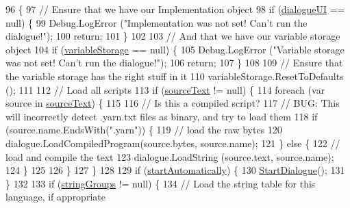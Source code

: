 \begin{DoxyCode}
96         \{
97             \textcolor{comment}{// Ensure that we have our Implementation object}
98             \textcolor{keywordflow}{if} (\hyperlink{a00073_ac87fdc65b0be57868f80c0fcd62ffd6d}{dialogueUI} == null) \{
99                 Debug.LogError (\textcolor{stringliteral}{"Implementation was not set! Can't run the dialogue!"});
100                 \textcolor{keywordflow}{return};
101             \}
102 
103             \textcolor{comment}{// And that we have our variable storage object}
104             \textcolor{keywordflow}{if} (\hyperlink{a00073_a6cca3d33f8b0ce3e750caed9fd8fc734}{variableStorage} == null) \{
105                 Debug.LogError (\textcolor{stringliteral}{"Variable storage was not set! Can't run the dialogue!"});
106                 \textcolor{keywordflow}{return};
107             \}
108 
109             \textcolor{comment}{// Ensure that the variable storage has the right stuff in it}
110             variableStorage.ResetToDefaults ();
111 
112             \textcolor{comment}{// Load all scripts}
113             \textcolor{keywordflow}{if} (\hyperlink{a00073_a71eae33d06990a3aec5d444fae017492}{sourceText} != null) \{
114                 \textcolor{keywordflow}{foreach} (var source \textcolor{keywordflow}{in} \hyperlink{a00073_a71eae33d06990a3aec5d444fae017492}{sourceText}) \{
115 
116                     \textcolor{comment}{// Is this a compiled script?}
117                     \textcolor{comment}{// BUG: This will incorrectly detect .yarn.txt files as binary, and try to load them}
118                     \textcolor{keywordflow}{if} (source.name.EndsWith(\textcolor{stringliteral}{".yarn"})) \{
119                         \textcolor{comment}{// load the raw bytes}
120                         dialogue.LoadCompiledProgram(source.bytes, source.name);
121                     \} \textcolor{keywordflow}{else} \{
122                         \textcolor{comment}{// load and compile the text}
123                         dialogue.LoadString (source.text, source.name);
124                     \}
125                     
126                 \}
127             \}
128 
129             \textcolor{keywordflow}{if} (\hyperlink{a00073_a6476a987f9788dba653976bcbe72980c}{startAutomatically}) \{
130                 \hyperlink{a00073_ab083d0ac60b41958b591c632e3c3a53e}{StartDialogue}();
131             \}
132 
133             \textcolor{keywordflow}{if} (\hyperlink{a00073_a4d00a0671c2966b88d1c806c675fe915}{stringGroups} != null) \{
134                 \textcolor{comment}{// Load the string table for this language, if appropriate}

\end{DoxyCode}
